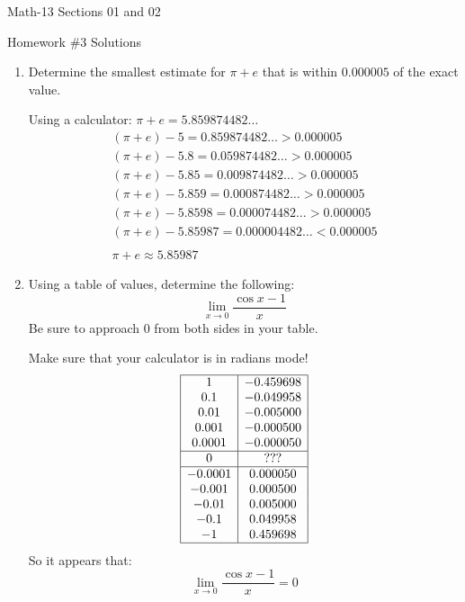 \documentclass[letterpaper,12pt,fleqn]{article}
\begin{document}
\begin{center}
  \large
  Math-13 Sections 01 and 02

  \Large
  Homework \#3 Solutions
\end{center}

\begin{enumerate}
\item Determine the smallest estimate for \(\pi+e\) that is within \(0.000005\) of the exact value.

  Using a calculator: \(\pi+e=5.859874482\ldots\)
  \begin{gather*}
    (\pi+e)-5=0.859874482\ldots>0.000005 \\
    (\pi+e)-5.8=0.059874482\ldots>0.000005 \\
    (\pi+e)-5.85=0.009874482\ldots>0.000005 \\
    (\pi+e)-5.859=0.000874482\ldots>0.000005 \\
    (\pi+e)-5.8598=0.000074482\ldots>0.000005 \\
    (\pi+e)-5.85987=0.000004482\ldots<0.000005 \\
    \\
    \pi+e\approx5.85987
  \end{gather*}

\item Using a table of values, determine the following:
  \[\lim_{x\to0}\frac{\cos x-1}{x}\]
  Be sure to approach \(0\) from both sides in your table.

  Make sure that your calculator is in radians mode!
  \[\begin{array}{|c|c|}
  \hline
  1 & -0.459698 \\
  0.1 & -0.049958 \\
  0.01 & -0.005000 \\
  0.001 & -0.000500 \\
  0.0001 & -0.000050 \\
  \hline
  0 & ??? \\
  \hline
  -0.0001 & 0.000050 \\
  -0.001 & 0.000500 \\
  -0.01 & 0.005000 \\
  -0.1 & 0.049958 \\
  -1 & 0.459698 \\
  \hline
  \end{array}\]
  So it appears that:
  \[\lim_{x\to0}\frac{\cos x-1}{x}=0\]
\end{enumerate}
\end{document}
